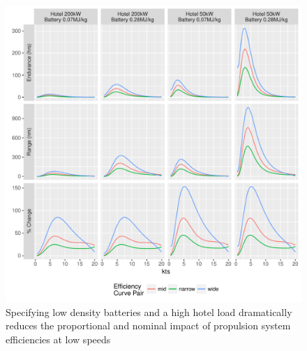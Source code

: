 \documentclass{article}\usepackage[]{graphicx}\usepackage[]{color}
\makeatletter
\def\maxwidth{ %
  \ifdim\Gin@nat@width>\linewidth
    \linewidth
  \else
    \Gin@nat@width
  \fi
}
\newenvironment{knitrout}{}{} %
\makeatother
\begin{document}
\begin{figure}
\begin{knitrout}
\color{fgcolor}

{\centering \includegraphics[width=\maxwidth]{figures/plots-plot_sens_corners-1} 

}



\end{knitrout}
\caption{Specifying low density batteries and a high hotel load dramatically reduces the proportional and nominal impact of propulsion system efficiencies at low speeds}
\label{fig:sens_corners}
\end{figure}
\end{document}
